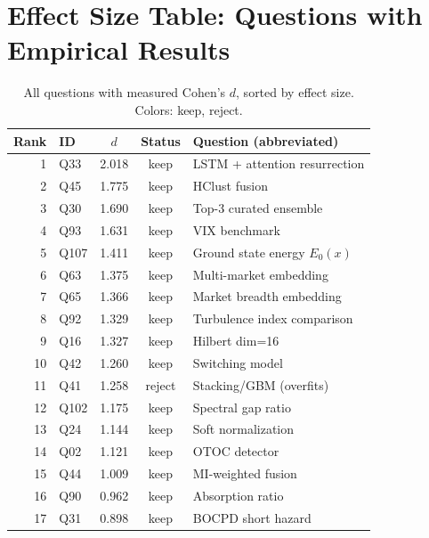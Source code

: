 \documentclass[11pt,a4paper]{article}
\begin{document}
\section{Effect Size Table: Questions with Empirical Results}

\begin{table}[H]
\centering
\small
\caption{All questions with measured Cohen's $d$, sorted by effect size. Colors: \colorbox{keepgreen!30}{keep}, \colorbox{rejectred!30}{reject}.}
\begin{tabular}{@{}rlccl@{}}
\toprule
\textbf{Rank} & \textbf{ID} & \textbf{$d$} & \textbf{Status} & \textbf{Question (abbreviated)} \\
\midrule
1  & Q33 & 2.018 & \cellcolor{keepgreen!30}keep & LSTM + attention resurrection \\
2  & Q45 & 1.775 & \cellcolor{keepgreen!30}keep & HClust fusion \\
3  & Q30 & 1.690 & \cellcolor{keepgreen!30}keep & Top-3 curated ensemble \\
4  & Q93 & 1.631 & \cellcolor{keepgreen!30}keep & VIX benchmark \\
5  & Q107 & 1.411 & \cellcolor{keepgreen!30}keep & Ground state energy $E_0(x)$ \\
6  & Q63 & 1.375 & \cellcolor{keepgreen!30}keep & Multi-market embedding \\
7  & Q65 & 1.366 & \cellcolor{keepgreen!30}keep & Market breadth embedding \\
8  & Q92 & 1.329 & \cellcolor{keepgreen!30}keep & Turbulence index comparison \\
9  & Q16 & 1.327 & \cellcolor{keepgreen!30}keep & Hilbert dim=16 \\
10 & Q42 & 1.260 & \cellcolor{keepgreen!30}keep & Switching model \\
11 & Q41 & 1.258 & \cellcolor{rejectred!30}reject & Stacking/GBM (overfits) \\
12 & Q102 & 1.175 & \cellcolor{keepgreen!30}keep & Spectral gap ratio \\
13 & Q24 & 1.144 & \cellcolor{keepgreen!30}keep & Soft normalization \\
14 & Q02 & 1.121 & \cellcolor{keepgreen!30}keep & OTOC detector \\
15 & Q44 & 1.009 & \cellcolor{keepgreen!30}keep & MI-weighted fusion \\
16 & Q90 & 0.962 & \cellcolor{keepgreen!30}keep & Absorption ratio \\
17 & Q31 & 0.898 & \cellcolor{keepgreen!30}keep & BOCPD short hazard \\

\end{tabular}
\end{table}
\end{document}
